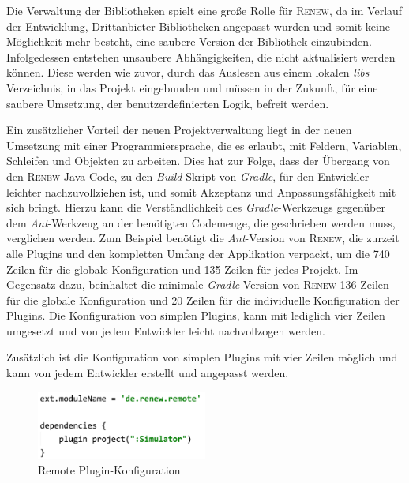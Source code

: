 	Die Verwaltung der Bibliotheken spielt eine große Rolle für \textsc{Renew}, da im Verlauf der Entwicklung, Drittanbieter-Bibliotheken angepasst wurden und somit keine Möglichkeit mehr besteht, eine saubere Version der Bibliothek einzubinden. Infolgedessen entstehen unsaubere Abhängigkeiten, die nicht aktualisiert werden können. Diese werden wie zuvor, durch das Auslesen aus einem lokalen \textit{libs} Verzeichnis, in das Projekt eingebunden und müssen in der Zukunft, für eine saubere Umsetzung, der benutzerdefinierten Logik, befreit werden.\bigbreak

	Ein zusätzlicher Vorteil der neuen Projektverwaltung liegt in der neuen Umsetzung mit einer Programmiersprache, die es erlaubt, mit Feldern, Variablen, Schleifen und Objekten zu arbeiten. Dies hat zur Folge, dass der Übergang von den \textsc{Renew} Java-Code, zu den \textit{Build}-Skript von \textit{Gradle}, für den Entwickler leichter nachzuvollziehen ist, und somit Akzeptanz und Anpassungsfähigkeit mit sich bringt. \newline
	Hierzu kann die Verständlichkeit des \textit{Gradle}-Werkzeugs gegenüber dem \textit{Ant}-Werkzeug an der benötigten Codemenge, die geschrieben werden muss, verglichen werden. Zum Beispiel benötigt die \textit{Ant}-Version von \textsc{Renew}, die zurzeit alle Plugins und den kompletten Umfang der Applikation verpackt, um die 740 Zeilen für die globale Konfiguration und 135 Zeilen für jedes Projekt. Im Gegensatz dazu, beinhaltet die minimale \textit{Gradle} Version von \textsc{Renew} 136 Zeilen für die globale Konfiguration und 20 Zeilen für die individuelle Konfiguration der Plugins. Die Konfiguration von simplen Plugins, kann mit lediglich vier Zeilen umgesetzt und von jedem Entwickler leicht nachvollzogen werden.

	Zusätzlich ist die Konfiguration von simplen Plugins mit vier Zeilen möglich und kann von jedem Entwickler erstellt und angepasst werden.

	\begin{figure}[h!]
	  \centering
	  \includegraphics[width=0.5\textwidth]{material/images/Remote_config.png}
	  \caption{Remote Plugin-Konfiguration}
	  \label{fig:remote_config}
	\end{figure}	

